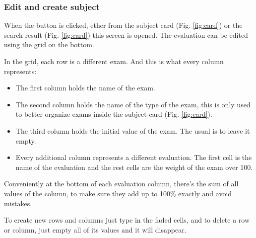 \clearpage\newpage
\subsubsection{Edit and create subject}

When the  button is clicked, ether from the subject card (Fig. \ref{fig:card}) or the search result (Fig. \ref{fig:card}) this screen is opened. 
The evaluation can be edited using the grid on the bottom.

In the grid, each row is a different exam. And this is what every column represents:
\begin{itemize}[itemsep=0mm]
    \item The first column holds the name of the exam.
    \item The second column holds the name of the type of the exam, this is only used to better organize exams inside the subject card (Fig. \ref{fig:card}).
    \item The third column holds the initial value of the exam. The usual is to leave it empty.
    \item Every additional column represents a different evaluation. The first cell is the name of the evaluation and the rest cells are the weight of the exam over 100.
\end{itemize}
Conveniently at the bottom of each evaluation column, there's the sum of all values of the column, to make sure they add up to 100\% exactly and avoid mistakes. 

To create new rows and columns just type in the faded cells, and to delete a row or column, just empty all of its values and it will disappear.


